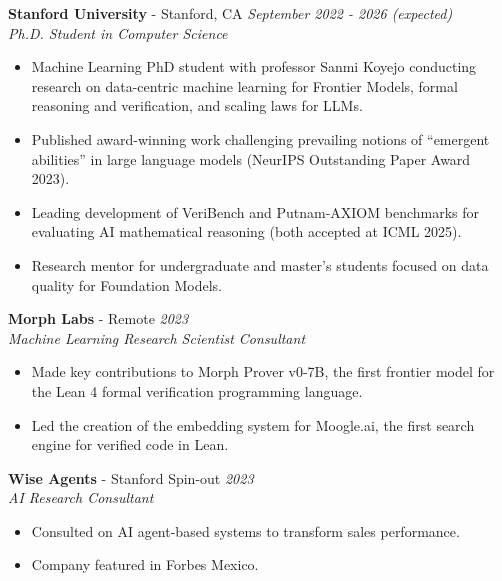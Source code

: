\documentclass{article}
\newenvironment{changemargin}[2]{%
  \begin{list}{}{%
    \setlength{\topsep}{0pt}%
    \setlength{\leftmargin}{#1}%
    \setlength{\rightmargin}{#2}%
    \setlength{\listparindent}{\parindent}%
    \setlength{\itemindent}{\parindent}%
    \setlength{\parsep}{\parskip}%
  }%
  \item[]}{\end{list}
}
\newenvironment{body} {
	\vspace*{-16pt}
	\begin{changemargin}{-0.25in}{-0.5in}
  }	
	{\end{changemargin}
}
\begin{document}
\begin{body}
	\vspace{16pt}
 
 	\textbf{Stanford University} - Stanford, CA \hfill \emph{September 2022 - 2026 (expected)}\\
	\emph{Ph.D. Student in Computer Science}\\
	\vspace*{-3pt}
	\begin{itemize} \itemsep -2pt  %
		\item Machine Learning PhD student with professor Sanmi Koyejo conducting research on data-centric machine learning for Frontier Models, formal reasoning and verification, and scaling laws for LLMs.
		\item Published award-winning work challenging prevailing notions of ``emergent abilities'' in large language models (NeurIPS Outstanding Paper Award 2023).
		\item Leading development of VeriBench and Putnam-AXIOM benchmarks for evaluating AI mathematical reasoning (both accepted at ICML 2025).
		\item Research mentor for undergraduate and master's students focused on data quality for Foundation Models.
	\end{itemize}
	\vspace{5 pt}

	\textbf{Morph Labs} - Remote \hfill \emph{2023}\\
	\emph{Machine Learning Research Scientist Consultant}\\
	\vspace*{-3pt}
	\begin{itemize} \itemsep -2pt
		\item Made key contributions to Morph Prover v0-7B, the first frontier model for the Lean 4 formal verification programming language.
		\item Led the creation of the embedding system for Moogle.ai, the first search engine for verified code in Lean.
	\end{itemize}
	\vspace{5 pt}

	\textbf{Wise Agents} - Stanford Spin-out \hfill \emph{2023}\\
	\emph{AI Research Consultant}\\
	\vspace*{-3pt}
	\begin{itemize} \itemsep -2pt
		\item Consulted on AI agent-based systems to transform sales performance.
		\item Company featured in Forbes Mexico.
	\end{itemize}
	\vspace{5 pt}


\end{body}
\end{document}
